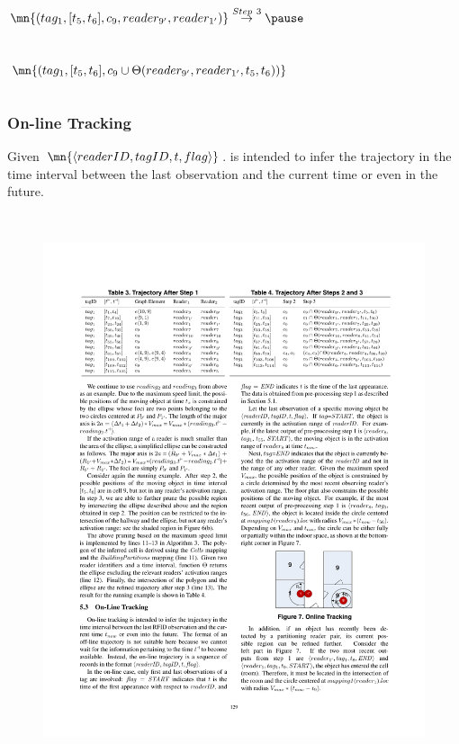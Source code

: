\begin{frame}
\begin{columns}[c]
{  $\mn{(tag_1, [t_5,t_6], c_9, reader_{9'}, reader_{1'})} \overset{Step~3}{\rightarrow} \pause$ \\~\\~\\

  $\mn{(tag_1, [t_5,t_6], c_9 \cup \Theta(reader_{9'}, reader_{1'}, t_5, t_6))}$
}

\end{columns}

\end{frame}


\begin{frame}
\frametitle{On-line Tracking}

\small{\textrm{Given $\mn{\langle readerID, tagID, t, flag \rangle}$.  is intended to infer the trajectory in the time interval between the last observation and the current time or even in the future.}}
\\~\\

\begin{columns}[c]

  \begin{figure}[tb]
    \includegraphics[width=\columnwidth]{figures/2-1/2-1-13.pdf}
  \end{figure}



\end{columns}
\end{frame}
